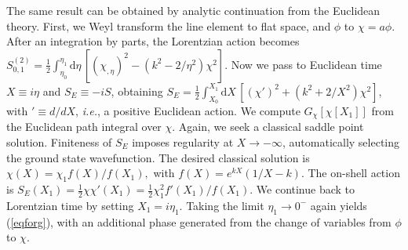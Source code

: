 \documentclass[twocolumn,amsmath,amssymb,superscriptaddress,nofootinbib]{revtex4-1}
\begin{document}
The same result can be obtained by analytic continuation from the Euclidean theory. First, we Weyl transform the line element to flat space, and $\phi$ to $\chi =a\phi$. After an integration by parts, the Lorentzian action becomes 
$S^{(2)}_{0,1}
=\frac{1}{2} \int_{\eta_0}^{\eta_1} \mathrm{d}\eta\, \left[ \left(\chi_{,\eta}\right)^2 -  (k^2-2/\eta^2) \chi^2\right]$. Now we pass to Euclidean time $X\equiv i\eta$ and 
 $S_E\equiv -iS$, obtaining $S_E=\frac{1}{2} \int_{ X_0}^{ X_1} \mathrm{d}X\, \left[ \left(\chi' \right)^2 +  (k^2+2/X^2) \chi^2\right]$, with $'\equiv d/dX$,
 {\it i.e.}, a positive Euclidean action.  We compute $G_\chi[\chi[X_1]]$ from the Euclidean path integral over $\chi$. Again, we seek a classical saddle point solution. Finiteness of $S_E$ imposes regularity at $X\rightarrow -\infty$,  automatically selecting the ground state wavefunction. The desired classical solution is $\chi(X)=\chi_1 f(X)/f(X_1),$ with  $f(X) =e^{k X}(1/X-k)$. The on-shell action is $S_E(X_1)=\frac{1}{2} \chi \chi'(X_1) = \frac{1}{2}\chi_1^2 f'(X_1)/f(X_1)$. We continue back to Lorentzian time by setting $X_1=i\eta_1$. Taking the limit $\eta_1\rightarrow 0^-$  again yields (\ref{eqforg}), with an additional phase generated from the change of variables from $\phi$ to $\chi$.
\end{document}

